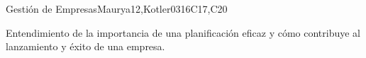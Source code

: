 \begin{syllabus}
\begin{unit}{Gestión de Empresas}{}{Maurya12,Kotler03}{16}{C17,C20}
\begin{learningoutcomes}
   \item Entendimiento de la importancia de una planificación eficaz y cómo contribuye al lanzamiento y éxito de una empresa.
\end{learningoutcomes}
\end{unit}



\begin{coursebibliography}
\end{coursebibliography}

\end{syllabus}

